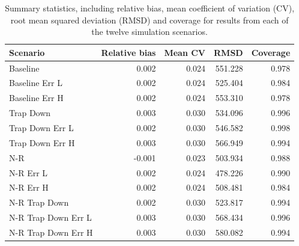 \documentclass[
  12pt,
]{article}
\begin{document}
\begin{table}

\caption{\label{tab:summ-tab}Summary statistics, including relative bias, mean coefficient of variation (CV), root mean squared deviation (RMSD) and coverage for results from each of the twelve simulation scenarios.}
\centering
\begin{tabular}[t]{lrrrr}
\toprule
Scenario & Relative bias & Mean CV & RMSD & Coverage\\
\midrule
Baseline & 0.002 & 0.024 & 551.228 & 0.978\\
Baseline Err L & 0.002 & 0.024 & 525.404 & 0.984\\
Baseline Err H & 0.002 & 0.024 & 553.310 & 0.978\\
Trap Down & 0.003 & 0.030 & 534.096 & 0.996\\
Trap Down Err L & 0.002 & 0.030 & 546.582 & 0.998\\
\addlinespace
Trap Down Err H & 0.003 & 0.030 & 566.949 & 0.994\\
N-R & -0.001 & 0.023 & 503.934 & 0.988\\
N-R Err L & 0.002 & 0.024 & 478.226 & 0.990\\
N-R Err H & 0.002 & 0.024 & 508.481 & 0.984\\
N-R Trap Down & 0.002 & 0.030 & 523.817 & 0.994\\
\addlinespace
N-R Trap Down Err L & 0.003 & 0.030 & 568.434 & 0.996\\
N-R Trap Down Err H & 0.003 & 0.030 & 580.082 & 0.994\\
\bottomrule
\end{tabular}
\end{table}
\end{document}
